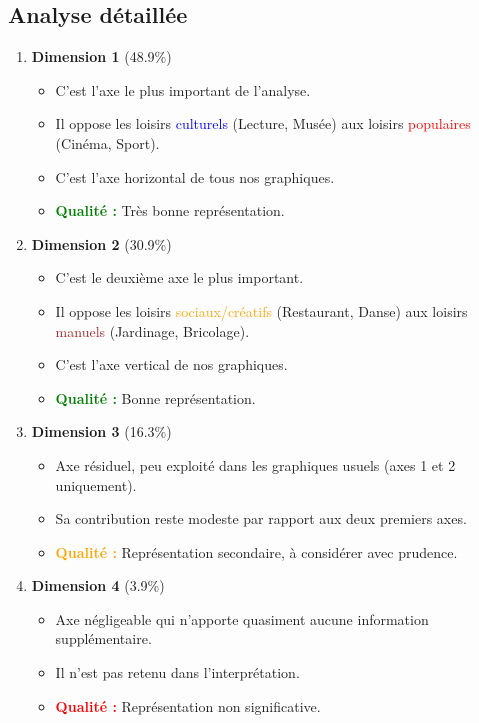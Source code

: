 \documentclass[12pt,a4paper]{book}
\begin{document}
	\subsection{Analyse détaillée}
	
	\begin{enumerate}
		\item \textbf{Dimension 1} (48.9\%)
		\begin{itemize}
			\item C'est l'axe le plus important de l'analyse.
			\item Il oppose les loisirs \textcolor{blue}{culturels} (Lecture, Musée) aux loisirs \textcolor{red}{populaires} (Cinéma, Sport).
			\item C'est l'axe horizontal de tous nos graphiques.
			\item \textcolor{green}{\textbf{Qualité :}} Très bonne représentation.
		\end{itemize}
		
		\item \textbf{Dimension 2} (30.9\%)
		\begin{itemize}
			\item C'est le deuxième axe le plus important.
			\item Il oppose les loisirs \textcolor{orange}{sociaux/créatifs} (Restaurant, Danse) aux loisirs \textcolor{brown}{manuels} (Jardinage, Bricolage).
			\item C'est l'axe vertical de nos graphiques.
			\item \textcolor{green}{\textbf{Qualité :}} Bonne représentation.
		\end{itemize}
		
		\item \textbf{Dimension 3} (16.3\%)
		\begin{itemize}
			\item Axe résiduel, peu exploité dans les graphiques usuels (axes 1 et 2 uniquement).
			\item Sa contribution reste modeste par rapport aux deux premiers axes.
			\item \textcolor{orange}{\textbf{Qualité :}} Représentation secondaire, à considérer avec prudence.
		\end{itemize}
		
		\item \textbf{Dimension 4} (3.9\%)
		\begin{itemize}
			\item Axe négligeable qui n'apporte quasiment aucune information supplémentaire.
			\item Il n'est pas retenu dans l'interprétation.
			\item \textcolor{red}{\textbf{Qualité :}} Représentation non significative.
		\end{itemize}
	\end{enumerate}
	
\end{document}
